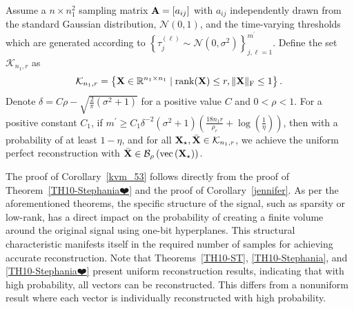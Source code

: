 \documentclass[12pt,draftcls,onecolumn]{IEEEtran}
\begin{document}
\begin{corollary}
\label{kvm_53}
Assume a $n\times n_1^2$ sampling matrix $\mathbf{A}=[a_{ij}]$ with $a_{ij}$ independently drawn from the standard Gaussian distribution, $\mathcal{N}(0,1)$,
and the time-varying thresholds which are generated according to $\left\{\tau^{(\ell)}_{j}\sim \mathcal{N}\left(0,\sigma^2\right)\right\}_{j,\ell=1}^{m^{\prime}}$. Define the set $\mathcal{K}_{n_1,r}$ as
\begin{equation}
\label{boz}
\mathcal{K}_{n_1,r}=\left\{\mbX\in\mathbb{R}^{n_1\times n_1}\mid \operatorname{rank}(\mbX)\leq r,\|\mbX\|_{\mathrm{F}}\leq 1\right\}.
\end{equation}
Denote $\delta=C\rho-\sqrt{\frac{2}{\pi}(\sigma^2+1)}$ for a positive value $C$ and $0<\rho<1$. For a positive constant $C_1$, if $m^{\prime}\geq C_1\delta^{-2}(\sigma^2+1)\left(\frac{18n_1r}{\rho_r}+\log\left(\frac{1}{\eta}\right)\right)$, then with a probability of at least $1-\eta$, and for all $\mathbf{X}_{\star},\bar{\mathbf{X}}\in\mathcal{K}_{n_1,r}$, we achieve the uniform perfect reconstruction with $\bar{\mathbf{X}}\in\mathcal{B}_\rho\left(\operatorname{vec}\left(\mathbf{X}_{\star}\right)\right)$.

\end{corollary}
The proof of Corollary~\ref{kvm_53} follows directly from the proof of Theorem~\ref{TH10-Stephania❤️} and the proof of Corollary~\ref{jennifer}. As per the aforementioned theorems, the specific structure of the signal, such as sparsity or low-rank, has a direct impact on the probability of creating a finite volume around the original signal using one-bit hyperplanes. This structural characteristic manifests itself in the required number of samples for achieving accurate reconstruction. Note that Theorems~\ref{TH10-ST}, \ref{TH10-Stephania}, and \ref{TH10-Stephania❤️} present uniform reconstruction results, indicating that with high probability, all vectors can be reconstructed. This differs from a nonuniform result where each vector is individually reconstructed with high probability.
\end{document}
